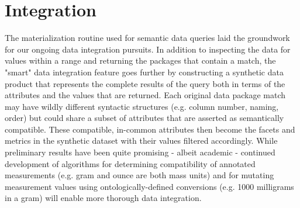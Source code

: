 
\section{Integration}

The materialization routine used for semantic data queries laid the groundwork for our ongoing data integration pursuits.
In addition to inspecting the data for values within a range and returning the packages that contain a match, the "smart" data integration feature goes further by constructing a synthetic data product that represents the complete results of the query both in terms of the attributes and the values that are returned. Each original data package match may have wildly different syntactic structures (e.g. column number, naming, order) but could share a subset of attributes that are asserted as semantically compatible. These compatible, in-common attributes then become the facets and metrics in the synthetic dataset with their values filtered accordingly. While preliminary results have been quite promising - albeit academic - continued development of algorithms for determining compatibility of annotated measurements (e.g. gram and ounce are both mass units) and for mutating measurement values using ontologically-defined conversions (e.g. 1000 milligrams in a gram) will enable more thorough data integration.

